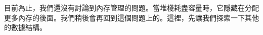 目前為止，我們還沒有討論到內存管理的問題。當堆棧耗盡容量時，它隱藏在分配更多內存的後面。我們稍後會再回到這個問題上的。這裡，先讓我們探索一下其他的數據結構。


































